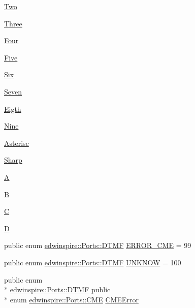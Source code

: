 \begin{DoxyCompactItemize}
\item 
\hyperlink{libspire__modem__new_8vala_ae1ebba61750a87cd3e04f7a0bcc54d41}{Two}
\item 
\hyperlink{libspire__modem__new_8vala_a7595488bbd935760242afd8a3a2c0dcd}{Three}
\item 
\hyperlink{libspire__modem__new_8vala_a3ffdf73f4d6c86cda4741740d081325c}{Four}
\item 
\hyperlink{libspire__modem__new_8vala_aee61276f9005313515feb62138be2b8c}{Five}
\item 
\hyperlink{libspire__modem__new_8vala_af327dfd1bc2e2ab345c37f6830271498}{Six}
\item 
\hyperlink{libspire__modem__new_8vala_a664c9d9eff9f8aedc5d91b3bc6625968}{Seven}
\item 
\hyperlink{libspire__modem__new_8vala_ac5a31d996f5dd33cf991970e41362b65}{Eigth}
\item 
\hyperlink{libspire__modem__new_8vala_abd916c08d176f7a521336059e38f4b25}{Nine}
\item 
\hyperlink{libspire__modem__new_8vala_a96eda96ce5ad0c1d1b6588690e70b48b}{Asterisc}
\item 
\hyperlink{libspire__modem__new_8vala_a2c88735882fca7962e70190bc67e5514}{Sharp}
\item 
\hyperlink{libspire__modem__new_8vala_a3b98e2dffc6cb06a89dcb0d5c60a0206}{A}
\item 
\hyperlink{libspire__modem__new_8vala_a9d3d9048db16a7eee539e93e3618cbe7}{B}
\item 
\hyperlink{libspire__modem__new_8vala_aaa53ca0b650dfd85c4f59fa156f7a2cc}{C}
\item 
\hyperlink{libspire__modem__new_8vala_a350bfcb1e3cfb28ddff48ce525d4f139}{D}
\item 
public enum \hyperlink{namespaceedwinspire_1_1_ports_af4e0ec730b70610713b98825eb7c6f53}{edwinspire\-::\-Ports\-::\-D\-T\-M\-F} \hyperlink{namespaceedwinspire_1_1_ports_aa67849e33e71e0685dee31059d242ac3}{E\-R\-R\-O\-R\-\_\-\-C\-M\-E} = 99
\item 
public enum \hyperlink{namespaceedwinspire_1_1_ports_af4e0ec730b70610713b98825eb7c6f53}{edwinspire\-::\-Ports\-::\-D\-T\-M\-F} \hyperlink{namespaceedwinspire_1_1_ports_a6d3970cfb8b14fc4c7c0682aefaecb11}{U\-N\-K\-N\-O\-W} = 100
\item 
public enum \\*
\hyperlink{namespaceedwinspire_1_1_ports_af4e0ec730b70610713b98825eb7c6f53}{edwinspire\-::\-Ports\-::\-D\-T\-M\-F} public \\*
enum \hyperlink{namespaceedwinspire_1_1_ports_ace89e61880474073c93815c34c52fe0d}{edwinspire\-::\-Ports\-::\-C\-M\-E} \hyperlink{namespaceedwinspire_1_1_ports_a6e1a116e42ac0d9aa022553ffbd3d841}{C\-M\-E\-Error}

\end{DoxyCompactItemize}
